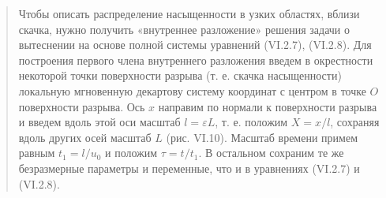 \documentclass[12pt,a4paper]{article}
\begin{document}
\begin{quote}\sloppy
Чтобы описать распределение насыщенности в узких областях, вблизи скачка, нужно получить «внутреннее разложение» решения задачи о вытеснении на основе полной системы уравнений (VI.2.7), (VI.2.8). Для построения первого члена внутреннего разложения введем в окрестности некоторой точки поверхности разрыва (т. е. скачка насыщенности) локальную мгновенную декартову систему координат с центром в точке $O$ поверхности разрыва. Ось $x$ направим по нормали к поверхности разрыва и введем вдоль этой оси масштаб $l=\varepsilon L$, т. е. положим $X=x/l$, сохраняя вдоль других осей масштаб $L$ (рис. VI.10). Масштаб времени примем равным $t_1=l/u_0$ и положим $\tau=t/t_1$. В остальном сохраним те же безразмерные параметры и переменные, что и в уравнениях (VI.2.7) и (VI.2.8).



\end{quote}
\end{document}
